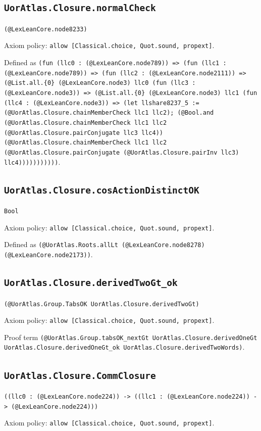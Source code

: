 \documentclass[11pt]{article}
\begin{document}
\subsection*{\texttt{UorAtlas.Closure.normalCheck}}
\noindent\texttt{(@LexLeanCore.node8233)}\par
\noindent Axiom policy: \texttt{allow [Classical.choice, Quot.sound, propext]}.\par
\noindent Defined as \texttt{(fun (llc0 : (@LexLeanCore.node789)) => (fun (llc1 : (@LexLeanCore.node789)) => (fun (llc2 : (@LexLeanCore.node2111)) => (@List.all.\{0\} (@LexLeanCore.node3) llc0 (fun (llc3 : (@LexLeanCore.node3)) => (@List.all.\{0\} (@LexLeanCore.node3) llc1 (fun (llc4 : (@LexLeanCore.node3)) => (let llshare8237\_5 := (@UorAtlas.Closure.chainMemberCheck llc1 llc2); (@Bool.and (@UorAtlas.Closure.chainMemberCheck llc1 llc2 (@UorAtlas.Closure.pairConjugate llc3 llc4)) (@UorAtlas.Closure.chainMemberCheck llc1 llc2 (@UorAtlas.Closure.pairConjugate (@UorAtlas.Closure.pairInv llc3) llc4)))))))))))}.\par
\subsection*{\texttt{UorAtlas.Closure.cosActionDistinctOK}}
\noindent\texttt{Bool}\par
\noindent Axiom policy: \texttt{allow [Classical.choice, Quot.sound, propext]}.\par
\noindent Defined as \texttt{(@UorAtlas.Roots.allLt (@LexLeanCore.node8278) (@LexLeanCore.node2173))}.\par
\subsection*{\texttt{UorAtlas.Closure.derivedTwoGt\_ok}}
\noindent\texttt{(@UorAtlas.Group.TabsOK UorAtlas.Closure.derivedTwoGt)}\par
\noindent Axiom policy: \texttt{allow [Classical.choice, Quot.sound, propext]}.\par
\noindent Proof term \texttt{(@UorAtlas.Group.tabsOK\_nextGt UorAtlas.Closure.derivedOneGt UorAtlas.Closure.derivedOneGt\_ok UorAtlas.Closure.derivedTwoWords)}.\par
\subsection*{\texttt{UorAtlas.Closure.CommClosure}}
\noindent\texttt{((llc0 : (@LexLeanCore.node224)) -> ((llc1 : (@LexLeanCore.node224)) -> (@LexLeanCore.node224)))}\par
\noindent Axiom policy: \texttt{allow [Classical.choice, Quot.sound, propext]}.\par
\end{document}
